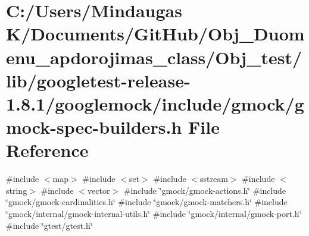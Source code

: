 \hypertarget{_obj__test_2lib_2googletest-release-1_88_81_2googlemock_2include_2gmock_2gmock-spec-builders_8h}{}\section{C\+:/\+Users/\+Mindaugas K/\+Documents/\+Git\+Hub/\+Obj\+\_\+\+Duomenu\+\_\+apdorojimas\+\_\+class/\+Obj\+\_\+test/lib/googletest-\/release-\/1.8.1/googlemock/include/gmock/gmock-\/spec-\/builders.h File Reference}
\label{_obj__test_2lib_2googletest-release-1_88_81_2googlemock_2include_2gmock_2gmock-spec-builders_8h}
{\ttfamily \#include $<$map$>$}\newline
{\ttfamily \#include $<$set$>$}\newline
{\ttfamily \#include $<$sstream$>$}\newline
{\ttfamily \#include $<$string$>$}\newline
{\ttfamily \#include $<$vector$>$}\newline
{\ttfamily \#include \char`\"{}gmock/gmock-\/actions.\+h\char`\"{}}\newline
{\ttfamily \#include \char`\"{}gmock/gmock-\/cardinalities.\+h\char`\"{}}\newline
{\ttfamily \#include \char`\"{}gmock/gmock-\/matchers.\+h\char`\"{}}\newline
{\ttfamily \#include \char`\"{}gmock/internal/gmock-\/internal-\/utils.\+h\char`\"{}}\newline
{\ttfamily \#include \char`\"{}gmock/internal/gmock-\/port.\+h\char`\"{}}\newline
{\ttfamily \#include \char`\"{}gtest/gtest.\+h\char`\"{}}\newline
